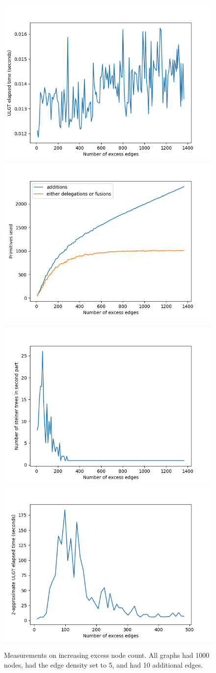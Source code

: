 \documentclass{article}
\begin{document}
\begin{landscape}
\begin{figure}
  \vspace{-1.7cm}
  \centering
  \includegraphics[width=0.48\columnwidth]{figures/excess_edge_time.png}
  \includegraphics[width=0.48\columnwidth]{figures/excess_edge_primitives.png}
  
  \includegraphics[width=0.48\columnwidth]{figures/excess_edge_steiner.png}
  \includegraphics[width=0.48\columnwidth]{figures/excess_edge_contraction_time.png}

  \caption{Measurements on increasing excess node count. All graphs had 1000 nodes, had the edge density set to 5, and had 10 additional edges.}
  \label{fig:excess-edges}
\end{figure}
\end{landscape}
\end{document}
